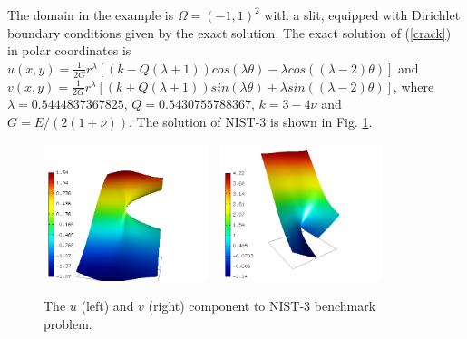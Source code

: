 \documentclass[12pt]{elsarticle}
\begin{document}
The domain in the example is $\Omega = (-1, 1)^2$ with a slit,
equipped with Dirichlet boundary conditions given by the
exact solution. The exact solution of (\ref{crack}) in polar coordinates is
$u(x, y) = \frac{1}{2G} r^{\lambda}[(k - Q(\lambda + 1))cos(\lambda \theta) - \lambda cos((\lambda - 2) \theta)]$ and
$v(x, y) = \frac{1}{2G} r^{\lambda}[(k + Q(\lambda + 1))sin(\lambda \theta) + \lambda sin((\lambda - 2) \theta)]$,
where $\lambda = 0.5444837367825$, $Q = 0.5430755788367$,
$k = 3 - 4 \nu$ and $G = E / (2(1 + \nu))$.
The solution of NIST-3 is shown in Fig. \ref{fig:sln-nist03}.

\begin{figure}[!ht]
\centering
\includegraphics[height=40mm]{nist/nist-3/solution-u.png}\ \
\includegraphics[height=40mm]{nist/nist-3/solution-v.png}
\caption{The $u$ (left) and $v$ (right) component to NIST-3 benchmark problem.}
\label{fig:sln-nist03}
\end{figure}
\end{document}
